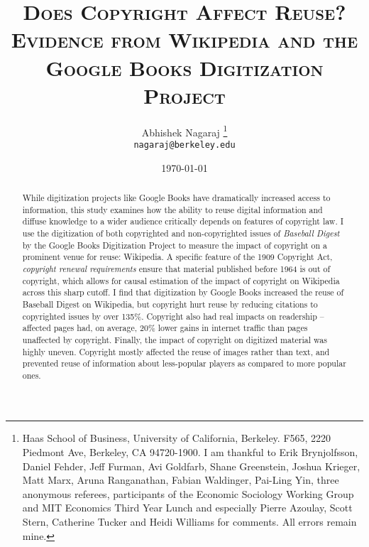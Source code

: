 \documentclass[11pt]{article}
\begin{document}
\setlength{\parskip}{4.5pt}

\baselineskip 18.5pt

\title{\textsc{Does Copyright Affect Reuse?\\ Evidence from Wikipedia and the Google Books Digitization Project}}

\author{Abhishek Nagaraj \footnote{Haas School of Business, University of California, Berkeley. F565, 2220 Piedmont Ave, Berkeley, CA 94720-1900. I am thankful to Erik Brynjolfsson, Daniel Fehder, Jeff Furman, Avi Goldfarb, Shane Greenstein, Joshua Krieger, Matt Marx, Aruna Ranganathan, Fabian Waldinger, Pai-Ling Yin, three anonymous referees, participants of the Economic Sociology Working Group and MIT Economics Third Year Lunch and especially Pierre Azoulay, Scott Stern, Catherine Tucker and Heidi Williams for comments. All errors remain mine.}
\\         \texttt{nagaraj@berkeley.edu}   
}

\date{\today}

\maketitle
\thispagestyle{empty}


\begin{abstract}
\normalsize
While digitization projects like Google Books have dramatically increased access to information, this study examines how the ability to reuse digital information and diffuse knowledge to a wider audience critically depends on features of copyright law. I use the digitization of both copyrighted and non-copyrighted issues of \emph{Baseball Digest} by the Google Books Digitization Project to measure the impact of copyright on a prominent venue for reuse: Wikipedia. A specific feature of the 1909 Copyright Act, \emph{copyright renewal requirements} ensure that material published before 1964 is out of copyright, which allows for causal estimation of the impact of copyright on Wikipedia across this sharp cutoff. I find that digitization by Google Books increased the reuse of Baseball Digest on Wikipedia, but copyright hurt reuse by reducing citations to copyrighted issues by over 135\%. Copyright also had real impacts on readership -- affected pages had, on average, 20\% lower gains in internet traffic than pages unaffected by copyright. Finally, the impact of copyright on digitized material was highly uneven. Copyright mostly affected the reuse of images rather than text, and prevented reuse of information about less-popular players as compared to more popular ones. 
\end{abstract}
\end{document}
